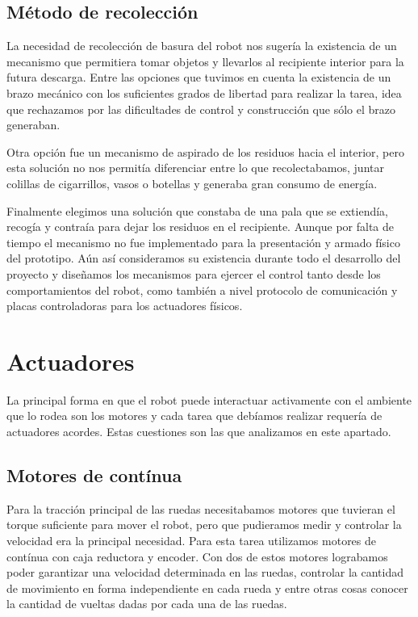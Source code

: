 \subsection{M\'etodo de recolecci\'on}
\label{h_ideas_recoleccion}

La necesidad de recolecci\'on de basura del robot nos suger\'ia la existencia de un mecanismo que permitiera
tomar objetos y llevarlos al recipiente interior para la futura descarga.
Entre las opciones que tuvimos en cuenta la existencia de un brazo mec\'anico con los suficientes grados de
libertad para realizar la tarea, idea que rechazamos por las dificultades de control y construcci\'on que
s\'olo el brazo generaban.

Otra opci\'on fue un mecanismo de aspirado de los residuos hacia el interior, pero esta soluci\'on no nos
permit\'ia diferenciar entre lo que recolectabamos, juntar colillas de cigarrillos, vasos o botellas y
generaba gran consumo de energ\'ia.

Finalmente elegimos una soluci\'on que constaba de una pala que se extiend\'ia, recog\'ia y contra\'ia para
dejar los residuos en el recipiente.
Aunque por falta de tiempo el mecanismo no fue implementado para la presentaci\'on y armado f\'isico del prototipo.
A\'un as\'i consideramos su existencia durante todo el desarrollo del proyecto y dise\~namos los mecanismos
para ejercer el control tanto desde los comportamientos del robot, como tambi\'en a nivel protocolo de
comunicaci\'on y placas controladoras para los actuadores f\'isicos.

\section{Actuadores}
\label{h_actuadores}

La principal forma en que el robot puede interactuar activamente con el ambiente que lo rodea son los motores y
cada tarea que deb\'iamos realizar requer\'ia de actuadores acordes.
Estas cuestiones son las que analizamos en este apartado.

\subsection{Motores de cont\'inua}
\label{h_actuadores_motorDC}

Para la tracci\'on principal de las ruedas necesitabamos motores que tuvieran el torque suficiente
para mover el robot, pero que pudieramos medir y controlar la velocidad era la principal necesidad.
Para esta tarea utilizamos motores de cont\'inua con caja reductora y encoder.
Con dos de estos motores lograbamos poder garantizar una velocidad determinada en las ruedas, controlar
la cantidad de movimiento en forma independiente en cada rueda y entre otras cosas conocer la cantidad
de vueltas dadas por cada una de las ruedas.

